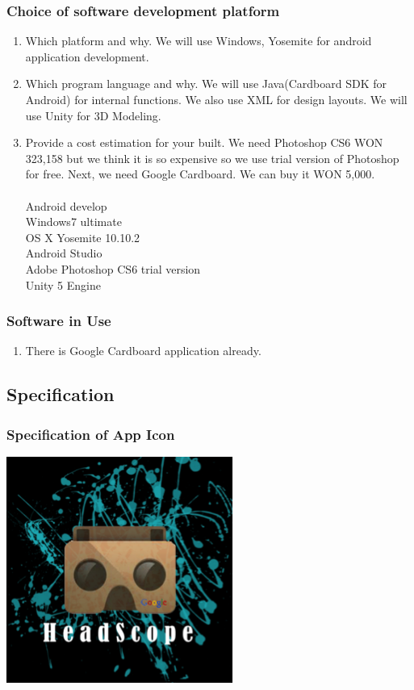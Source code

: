 \documentclass[12pt]{article}
\begin{document}

\subsubsection{Choice of software development platform}
\begin{enumerate}
\item Which platform and why. We will use Windows, Yosemite for android application development.
\item Which  program language and why. We will use Java(Cardboard SDK for Android) for internal functions. We also use XML for design layouts. We will use Unity for 3D Modeling.
\item Provide a cost estimation for your built. We need Photoshop CS6 WON 323,158  but we think it is so expensive so we use trial version of Photoshop for free. Next, we need Google Cardboard. We can buy it WON 5,000.\\ \\
Android develop\\
Windows7 ultimate\\
OS X Yosemite 10.10.2\\
Android Studio\\
Adobe Photoshop CS6 trial version\\
Unity 5 Engine\\
\end{enumerate}

\subsubsection{Software in Use}
\begin{enumerate}
\item There is Google Cardboard application already.
\end{enumerate}


\subsection{Specification}


\subsubsection{Specification of App Icon}
\includegraphics{HeadScope}
\end{document}
